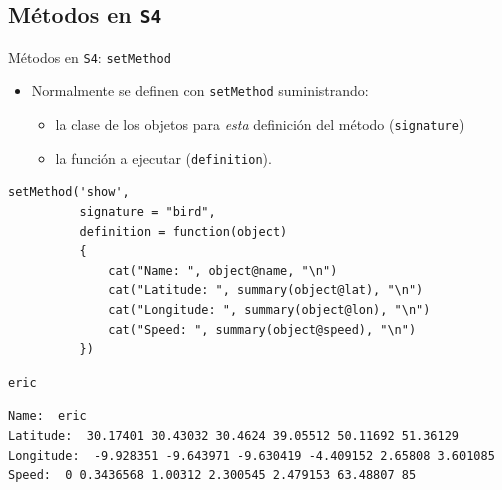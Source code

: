 \documentclass[xcolor={usenames,svgnames,dvipsnames}]{beamer}
\begin{document}
\subsection{Métodos en \texttt{S4}}
\label{sec:orgda8250b}

\begin{frame}[label={sec:orgb9c3cfe},fragile]{Métodos en \texttt{S4}: \texttt{setMethod}}
 \begin{itemize}
\item Normalmente se definen con \texttt{setMethod} suministrando:
\begin{itemize}
\item la clase de los objetos para \emph{esta} definición del
método (\texttt{signature})
\item la función a ejecutar (\texttt{definition}).
\end{itemize}
\end{itemize}
\lstset{language=r,label= ,caption= ,captionpos=b,numbers=none}
\begin{lstlisting}
setMethod('show',
          signature = "bird",
          definition = function(object)
          {
              cat("Name: ", object@name, "\n")
              cat("Latitude: ", summary(object@lat), "\n")
              cat("Longitude: ", summary(object@lon), "\n")
              cat("Speed: ", summary(object@speed), "\n")
          })
\end{lstlisting}

\lstset{language=r,label= ,caption= ,captionpos=b,numbers=none}
\begin{lstlisting}
eric
\end{lstlisting}

\begin{verbatim}
Name:  eric 
Latitude:  30.17401 30.43032 30.4624 39.05512 50.11692 51.36129 
Longitude:  -9.928351 -9.643971 -9.630419 -4.409152 2.65808 3.601085 
Speed:  0 0.3436568 1.00312 2.300545 2.479153 63.48807 85
\end{verbatim}
\end{frame}
\end{document}
